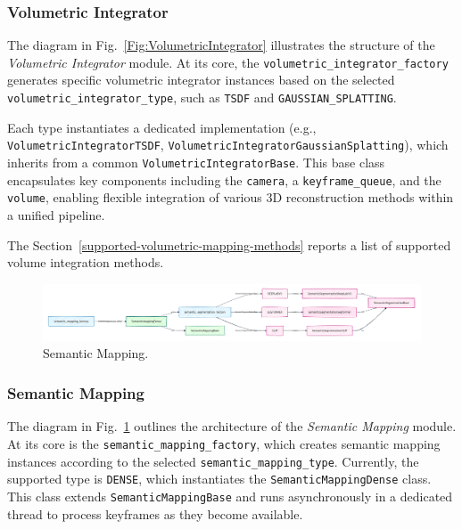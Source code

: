 \documentclass{article}
\begin{document}
\subsubsection{Volumetric Integrator}

The diagram in Fig.~\ref{Fig:VolumetricIntegrator} illustrates the structure of the \textit{Volumetric Integrator} module. At its core, the \texttt{volumetric\_integrator\_factory} generates specific volumetric integrator instances based on the selected \texttt{volumetric\_integrator\_type}, such as \texttt{TSDF} and \texttt{GAUSSIAN\_SPLATTING}.

Each type instantiates a dedicated implementation (e.g., \texttt{VolumetricIntegratorTSDF}, \texttt{VolumetricIntegrator\-Gaussian\-Splatting}), which inherits from a common \texttt{VolumetricIntegratorBase}. This base class encapsulates key components including the \texttt{camera}, a \texttt{keyframe\_queue}, and the \texttt{volume}, enabling flexible integration of various 3D reconstruction methods within a unified pipeline.

The Section~\ref{supported-volumetric-mapping-methods} reports a list of supported volume integration methods.


\begin{figure}[!t]
\begin{center}
    \includegraphics[width=\textwidth]{./images/semantic_mapping.png}
\end{center}
\caption{Semantic Mapping.}
\label{Fig:SemanticMapping}
\end{figure}



\subsubsection{Semantic Mapping}

The diagram in Fig.~\ref{Fig:SemanticMapping} outlines the architecture of the \textit{Semantic Mapping} module. At its core is the \texttt{semantic\_mapping\_factory}, which creates semantic mapping instances according to the selected \texttt{semantic\_mapping\_type}. Currently, the supported type is \texttt{DENSE}, which instantiates the \texttt{SemanticMappingDense} class. This class extends \texttt{SemanticMappingBase} and runs asynchronously in a dedicated thread to process keyframes as they become available.
\end{document}
